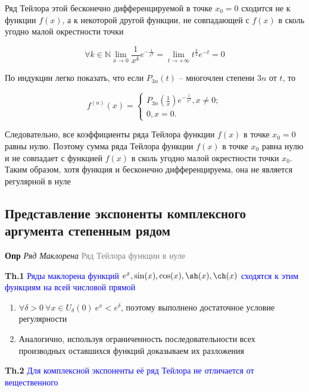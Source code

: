 Ряд Тейлора этой бесконечно дифференцируемой в точке $x_0 = 0$ сходится не к функции $f(x)$, а к
некоторой другой функции, не совпадающей с $f(x)$ в сколь угодно малой окрестности точки

\[ \forall k \in \mathbb{N} \lim_{x \to 0} \frac{1}{x^k} e^{-\frac{1}{x^2}} = \lim_{t \to +\infty} t^{\frac{k}{2}} e^{-t} = 0 \]

По индукции легко показать, что если $P_{3n} (t)$ -- многочлен степени $3n$ от $t$, то

\begin{equation}
    f^{(n)}(x) =
    \begin{cases}
        P_{3n} (\frac{1}{x}) e^{-\frac{1}{x^2}}, x \neq 0; \\
        0, x = 0.
    \end{cases}
\end{equation}

Следовательно, все коэффициенты ряда Тейлора функции $f(x)$ в точке $x_0 = 0$ равны нулю.
Поэтому сумма ряда Тейлора функции $f(x)$ в точке $x_0$ равна нулю и не совпадает с функцией $f(x)$ в сколь угодно
малой окрестности точки $x_0$.
Таким образом, хотя функция и бесконечно дифференцируема, она не является регулярной в нуле

\subsection{Представление экспоненты комплексного аргумента степенным рядом}

\textbf{Опр} \textit{Ряд Маклорена} \textcolor{gray}{Ряд Тейлора функции в нуле}

\textbf{Th.1} \textcolor{blue}{Ряды маклорена функций $e^x, \sin(x), \cos(x), \sh(x), \ch(x)$ сходятся к этим
функциям на всей числовой прямой}

\begin{enumerate}
    \item $\forall \delta > 0~\forall x \in U_\delta (0)~e^x < e^\delta$, поэтому выполнено достаточное условие
    регулярности
    \item Аналогично, используя ограниченность последовательности всех производных оставшихся функций доказываем
    их разложения
\end{enumerate}

\textbf{Th.2} \textcolor{blue}{Для комплексной экспоненты её ряд Тейлора не отличается от вещественного}


